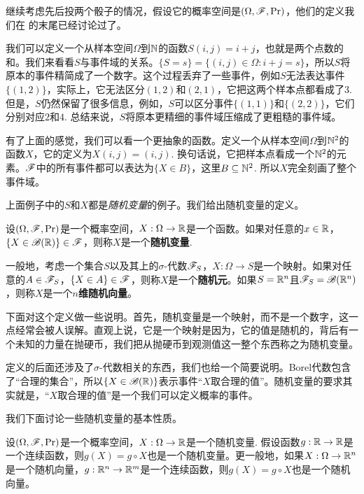 \begin{example}\label{ex:random-variable}
继续考虑先后投两个骰子的情况，假设它的概率空间是$(\Omega,\mathscr{F},\Pr)$，他们的定义我们在 的末尾已经讨论过了。

我们可以定义一个从样本空间$\Omega$到$\mathbb{N}$的函数$S(i,j)=i+j$，也就是两个点数的和。我们来看看$S$与事件域的关系。$\{S=s\}=\{(i,j)\in\Omega:i+j=s\}$，所以$S$将原本的事件精简成了一个数字。这个过程丢弃了一些事件，例如$S$无法表达事件$\{(1,2)\}$，实际上，它无法区分$(1,2)$和$(2,1)$，它把这两个样本点都看成了$3$. 但是，$S$仍然保留了很多信息，例如，$S$可以区分事件$\{(1,1)\}$和$\{(2,2)\}$，它们分别对应$2$和$4$. 总结来说，$S$将原本更精细的事件域压缩成了更粗糙的事件域。

有了上面的感觉，我们可以看一个更抽象的函数。定义一个从样本空间$\Omega$到$\mathbb{N}^2$的函数$X$，它的定义为$X(i,j) = (i,j)$. 换句话说，它把样本点看成一个$\mathbb{N}^2$的元素。$\mathscr{F}$中的所有事件都可以表达为$\{X\in B\}$，这里$B\subseteq\mathbb{N}^2$. 所以$X$完全刻画了整个事件域。
\end{example}

上面例子中的$S$和$X$都是\emph{随机变量}的例子。我们给出随机变量的定义。

\begin{definition}
设$(\Omega,\mathscr{F},\Pr)$是一个概率空间，$X:\Omega\to\mathbb{R}$是一个函数。如果对任意的$x\in\mathbb{R}$，$\{X\in\mathscr{B}(\mathbb{R})\}\in\mathscr{F}$，则称$X$是一个\textbf{随机变量}. 

一般地，考虑一个集合$S$以及其上的$\sigma$-代数$\mathscr{F}_S$，$X:\Omega\to S$是一个映射。如果对任意的$A\in\mathscr{F}_S$，$\{X\in A\}\in\mathscr{F}$，则称$X$是一个\textbf{随机元}。如果$S=\mathbb{R}^n$且$\mathscr{F}_S=\mathscr{B}(\mathbb{R}^n)$，则称$X$是一个\textbf{$n$维随机向量}。
\end{definition}

下面对这个定义做一些说明。首先，随机变量是一个映射，而不是一个数字，这一点经常会被人误解。直观上说，它是一个映射是因为，它的值是随机的，背后有一个未知的力量在抛硬币，我们把从抛硬币到观测值这一整个东西称之为随机变量。

定义的后面还涉及了$\sigma$-代数相关的东西，我们也给一个简要说明。Borel代数包含了“合理的集合”，所以$\{X\in\mathscr{B}(\mathbb{R})\}$表示事件“$X$取合理的值”。随机变量的要求其实就是，“$X$取合理的值”是一个我们可以定义概率的事件。

我们下面讨论一些随机变量的基本性质。

\begin{proposition}\label{prop:random-variable}
设$(\Omega,\mathscr{F},\Pr)$是一个概率空间，$X:\Omega\to\mathbb{R}$是一个随机变量. 假设函数$g:\mathbb{R}\to\mathbb{R}$是一个连续函数，则$g(X)=g\circ X$也是一个随机变量。更一般地，如果$X:\Omega\to\mathbb{R}^n$是一个随机向量，$g:\mathbb{R}^n\to\mathbb{R}^m$是一个连续函数，则$g(X)=g\circ X$也是一个随机向量。
\end{proposition}

